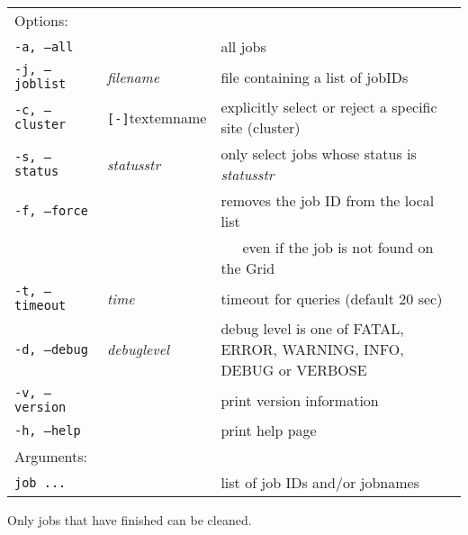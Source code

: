 \hspace*{0.5cm}
\begin{shaded}
\end{shaded}
\begin{longtable}{llp{8cm}}
   Options:&&\\
   \texttt{-a, --all}& & all jobs\\
   \texttt{-j, --joblist}& \textit{filename} & file containing a list of jobIDs\\
   \texttt{-c, --cluster}&\verb#[-]#textem{name}&explicitly select or reject a specific site (cluster)\\
   \texttt{-s, --status}& \textit{statusstr} &only select jobs whose status is \textit{statusstr}\\
   \texttt{-f, --force} & & removes the job ID from the local list\\
   & &~~~even if the job is not found on the Grid\\
   \texttt{-t, --timeout}& \textit{time} & timeout for queries (default 20 sec)\\
   \texttt{-d, --debug}& \textit{debuglevel}&debug level is one of  FATAL, ERROR, WARNING, INFO, DEBUG or VERBOSE\\
   \texttt{-v, --version}& & print version information\\
   \texttt{-h, --help}& & print help page\\
   Arguments:&&\\
   \texttt{job ...} && list of job IDs and/or jobnames\\
\end{longtable}

Only jobs that have finished can be cleaned.

